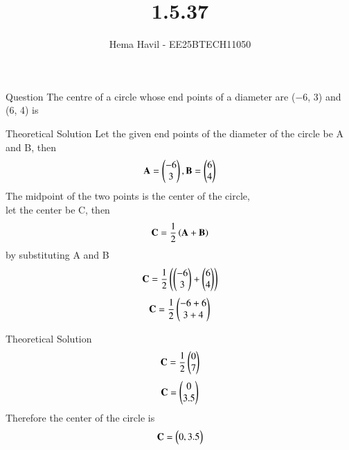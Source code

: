 \documentclass{beamer}
\title %
{1.5.37}
\author %
{Hema Havil - EE25BTECH11050}
\begin{document}
	
	\frame{\titlepage}
	\begin{frame}{Question}
		The centre of a circle whose end points of a diameter are (−6, 3) and (6, 4) is \underline{\hspace{3cm}}
	\end{frame}

	
\begin{frame}{Theoretical Solution}
	Let the given end points of the diameter of the circle be A and B, then\\
         \begin{align}
             \mathbf{A} = \begin{pmatrix}-6 \\ 3\end{pmatrix}, \mathbf{B} = \begin{pmatrix}6 \\ 4\end{pmatrix}
         \end{align}
         The midpoint of the two points is the center of the circle,\\
         let the center be C, then
         \begin{align}
             \mathbf{C}=\frac{1}{2} \left(\mathbf{A}+\mathbf{B}\right)
         \end{align}
         by substituting A and B
         \begin{align}
             \mathbf{C}=\frac{1}{2}\left(\begin{pmatrix}-6 \\ 3\end{pmatrix} + \begin{pmatrix}6 \\ 4\end{pmatrix}\right)
         \end{align}
         \begin{align}
             \mathbf{C}=\frac{1}{2}\begin{pmatrix}-6+6 \\ 3+4\end{pmatrix}
         \end{align}
\end{frame}
\begin{frame}{Theoretical Solution}
\begin{align}
             \mathbf{C}=\frac{1}{2}\begin{pmatrix}0 \\ 7\end{pmatrix}
         \end{align}
         \begin{align}
             \mathbf{C}=\begin{pmatrix}0 \\ 3.5\end{pmatrix}
         \end{align}
         Therefore the center of the circle is \\
         \begin{align*}
             \mathbf{C}=\begin{pmatrix}0 , 3.5\end{pmatrix}
         \end{align*}
	\end{frame}
	
\end{document}
